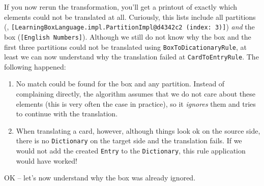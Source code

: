If you now rerun the transformation, you'll get a printout of exactly which elements could not be translated at all.
Curiously, this lists include all partitions (\eg, \texttt{[LearningBoxLanguage.impl.PartitionImpl@d4342c2 (index: 3)]}) \emph{and} the box (\texttt{[English Numbers]}).
Although we still do not know why the box and the first three partitions could not be translated using \texttt{BoxToDicationaryRule}, at least we can now understand why the translation failed at \texttt{CardToEntryRule}.
The following happened:
\begin{enumerate}
\item No match could be found for the box and any partition.  
Instead of complaining directly, the algorithm assumes that we do not care about these elements (this is very often the case in practice), so it \emph{ignores} them and tries to continue with the translation.
\item When translating a card, however, although things look ok on the source side, there is no \texttt{Dictionary} on the target side and the translation fails.
If we would not add the created \texttt{Entry} to the \texttt{Dictionary}, this rule application would have worked! 
\end{enumerate}

OK -- let's now understand why the box was already ignored.

